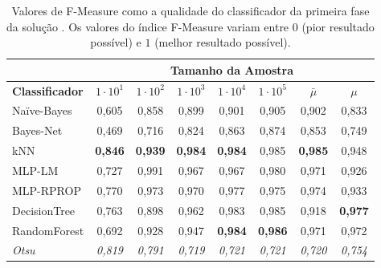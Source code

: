 \begin{table}[!b]
\centering
\caption[Valores de F-Measure como a qualidade do classificador da primeira fase da solução \system]{Valores de F-Measure como a qualidade do classificador da primeira fase da solução \system. 
Os valores do índice F-Measure variam entre $0$ (pior resultado possível) e $1$ (melhor resultado possível).}
\label{tab:classifiersF1}
\begin{tabular}{l|c|c|c|c|c||c|c} \hline \hline
 & 
\multicolumn{7}{c}{ {\cellcolor[HTML]{68CBD0}\textbf{Tamanho da Amostra}} }    \\ \hline
\cellcolor[HTML]{68CBD0} \textbf{Classificador} & 
\cellcolor[HTML]{68CBD0} \textbf{$1 \cdot 10^1$}  & 
\cellcolor[HTML]{68CBD0} \textbf{$1 \cdot 10^2$}  & 
\cellcolor[HTML]{68CBD0} \textbf{$1 \cdot 10^3$}  & 
\cellcolor[HTML]{68CBD0} \textbf{$1 \cdot 10^4$}  & 
\cellcolor[HTML]{68CBD0} \textbf{$1 \cdot 10^5$}  &
\cellcolor[HTML]{68CBD0} \textbf{$\bar{\mu}$} &
\cellcolor[HTML]{68CBD0} \textbf{$\mu$}\\ \hline \hline
Na\"ive-Bayes         & 0,605 & 0,858 & 0,899 & 0,901 & 0,905  & 0,902 & 0,833 \\ \hline
Bayes-Net         & 0,469 & 0,716 & 0,824 & 0,863 & 0,874  & 0,853 & 0,749 \\ \hline
kNN        & \textbf{0,846} & \textbf{0,939} & \textbf{0,984} & \textbf{0,984} & 0,985 & \textbf{0,985} & 0,948\\ \hline
MLP-LM & 0,727 & 0,991 & 0,967 & 0,967 & 0,980 & 0,971 & 0,926 \\ \hline
MLP-RPROP     & 0,770 & 0,973 & 0,970 & 0,977 & 0,975  & 0,974 & 0,933 \\ \hline
DecisionTree & 0,763 & 0,898 & 0,962 & 0,983 & 0,985  & 0,918 & \textbf{0,977} \\ \hline
RandomForest         & 0,692 & 0,928 & 0,947 & \textbf{0,984} & \textbf{0,986} & 0,971 & 0,972 \\ \hline \hline
\textit{Otsu} & \textit{0,819} & \textit{0,791} & \textit{0,719} & \textit{0,721} & \textit{0,721}  & \textit{0,720} & \textit{0,754} \\ \hline\hline
\end{tabular}
\end{table}


